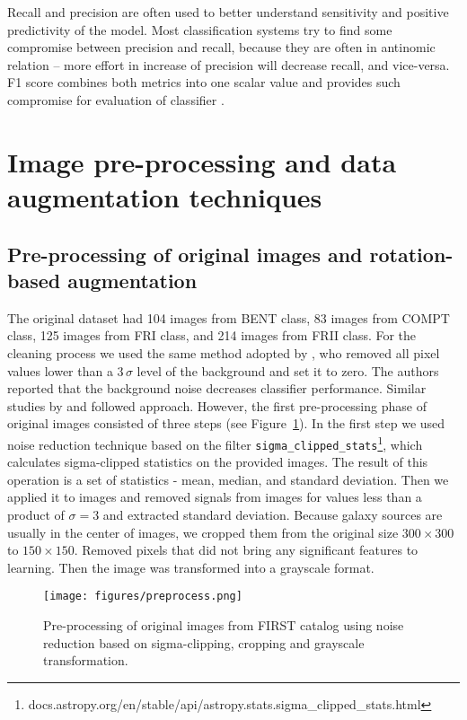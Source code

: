 \documentclass[fleqn,usenatbib]{mnras}
\begin{document}
Recall and precision are often used to better understand sensitivity and positive predictivity of the model. Most classification systems try to find some compromise between precision and recall, because they are often in antinomic relation – more effort in increase of precision will decrease recall, and vice-versa. F1 score combines both metrics into one scalar value and provides such compromise for evaluation of classifier \citep{han2011data}.

\section{Image pre-processing and data augmentation techniques}

\subsection{Pre-processing of original images and rotation-based augmentation}

The original dataset had 104 images from BENT class, 83 images from COMPT class, 125 images from  FRI class, and 214 images from FRII class. For the cleaning process we used the same method adopted by \citet{3}, who removed all pixel values lower than a $3\,\sigma$ level of the background and set it to zero. The authors reported that the background noise decreases classifier performance. Similar studies by \citet{2} and \citet{1} followed \citet{3} approach. However, the first pre-processing phase of original images consisted of three steps (see Figure~\ref{fig:sigma}). In the first step we used noise reduction technique based on the filter \texttt{sigma\_clipped\_stats}\footnote{docs.astropy.org/en/stable/api/astropy.stats.sigma\_clipped\_stats.html}, which calculates sigma-clipped statistics on the provided images. The result of this operation is a set of statistics - mean, median, and standard deviation. Then we applied it to images and removed signals from images for values less than a product of $\sigma=3$ and extracted standard deviation. Because galaxy sources are usually in the center of images, we cropped them from the original size $300\times300$ to $150\times150$. Removed pixels that did not bring any significant features to learning. Then the image was transformed into a grayscale format. 

\begin{figure}
    \centering
    \texttt{[image: figures/preprocess.png]}
    \caption{Pre-processing of original images from FIRST catalog using noise reduction based on sigma-clipping, cropping and grayscale transformation.}
    \label{fig:sigma}
\end{figure}
\end{document}
